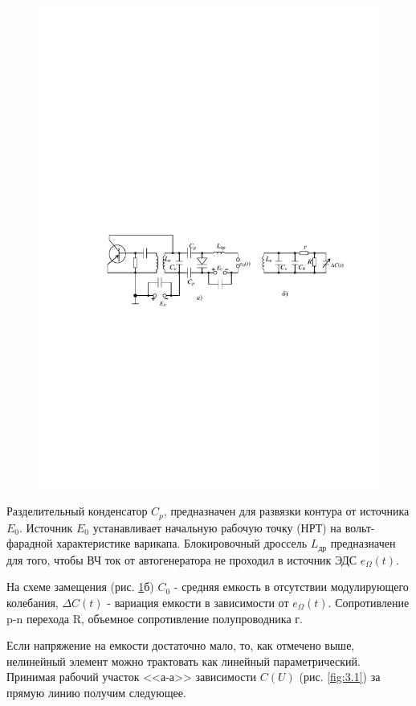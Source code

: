 \begin{figure}[H]
	\centering
	\includegraphics[]{fig/fig3-2}
	\caption{}
	\label{fig:3.2}
\end{figure}
Разделительный конденсатор $C_p$, предназначен для развязки контура от источника $E_0$. Источник $E_0$ устанавливает начальную рабочую точку (НРТ) на вольт-фарадной характеристике варикапа. Блокировочный дроссель $L_\text{др}$ предназначен для того, чтобы ВЧ ток от автогенератора не проходил в источник ЭДС $e_{\Omega}(t)$.

На схеме замещения (рис. \ref{fig:3.2}б) $C_0$ - средняя емкость в отсутствии модулирующего колебания, $\Delta C(t)$ - вариация емкости в зависимости от  $e_{\Omega}(t)$. Сопротивление p-n перехода R, объемное сопротивление полупроводника г.

Если напряжение на емкости достаточно мало, то, как отмечено выше, нелинейный элемент можно трактовать как линейный параметрический. Принимая рабочий участок <<а-а>> зависимости $C(U)$ (рис. \ref{fig:3.1}) за прямую линию получим следующее.

